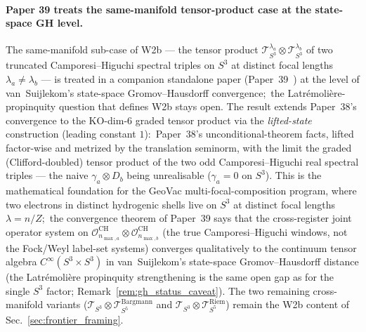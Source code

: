 \documentclass[11pt]{article}
\providecommand{\Tcal}{\mathcal{T}}
\providecommand{\sthree}{S^3}
\providecommand{\nmaxa}{n_{\max, a}}
\providecommand{\nmaxb}{n_{\max, b}}
\begin{document}
\paragraph{Paper 39 treats the same-manifold tensor-product case at the
state-space GH level.}
The same-manifold sub-case of W2b --- the tensor product
$\Tcal_{\sthree}^{\lambda_a} \otimes \Tcal_{\sthree}^{\lambda_b}$ of
two truncated Camporesi--Higuchi spectral triples on $\sthree$ at
distinct focal lengths $\lambda_a \neq \lambda_b$ --- is treated in a
companion standalone paper (Paper~39~\cite{paper39}) at the level of
van~Suijlekom's state-space Gromov--Hausdorff convergence;\ the
Latr\'emoli\`ere-propinquity question that defines W2b stays open. The result
extends Paper~38's convergence to the KO-dim-$6$ graded tensor product
via the \emph{lifted-state} construction (leading constant $1$):\ Paper~38's
unconditional-theorem facts, lifted factor-wise and metrized by the
translation seminorm, with the limit the graded (Clifford-doubled) tensor
product of the two odd Camporesi--Higuchi real spectral triples --- the
naive $\gamma_a \otimes D_b$ being unrealisable ($\gamma_a = 0$ on
$\sthree$).  This is
the mathematical foundation for the GeoVac multi-focal-composition
program, where two electrons in distinct hydrogenic shells live on
$\sthree$ at distinct focal lengths $\lambda = n/Z$;\ the convergence
theorem of Paper~39 says that the cross-register joint
operator system on $\mathcal{O}^{\mathrm{CH}}_{\nmaxa} \otimes \mathcal{O}^{\mathrm{CH}}_{\nmaxb}$ (the true Camporesi--Higuchi windows, not the Fock/Weyl label-set systems) converges
qualitatively to the continuum tensor algebra $C^\infty(\sthree
\times \sthree)$ in van~Suijlekom's state-space Gromov--Hausdorff
distance (the Latr\'emoli\`ere propinquity strengthening is the same
open gap as for the single $\sthree$ factor; Remark~\ref{rem:gh_status_caveat}). The two
remaining cross-manifold variants
($\Tcal_{\sthree} \otimes \Tcal_{S^5}^{\mathrm{Bargmann}}$ and
$\Tcal_{\sthree} \otimes \Tcal_{S^5}^{\mathrm{Riem}}$) remain the W2b
content of Sec.~\ref{sec:frontier_framing}.
\end{document}
